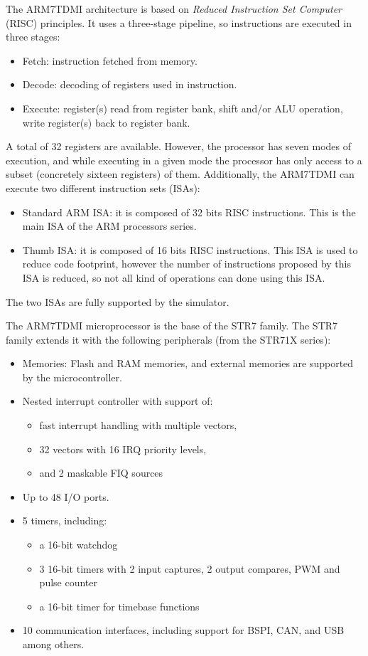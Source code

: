 The ARM7TDMI architecture is based on \textit{Reduced Instruction Set Computer} (RISC) principles.
It uses a three-stage pipeline, so instructions are executed in three stages:
\begin{itemize}
	\item Fetch: instruction fetched from memory.
	\item Decode: decoding of registers used in instruction.
	\item Execute: register(s) read from register bank, shift and/or ALU operation, write register(s) back to register bank.
\end{itemize}
A total of 32 registers are available.
However, the processor has seven modes of execution, and while executing in a given mode the processor has only access to a subset (concretely sixteen registers) of them.
Additionally, the ARM7TDMI can execute two different instruction sets (ISAs):
\begin{itemize}
	\item Standard ARM ISA: it is composed of 32 bits RISC instructions. This is the main ISA of the ARM processors series.
	\item Thumb ISA: it is composed of 16 bits RISC instructions. This ISA is used to reduce code footprint, however the number of instructions proposed by this ISA is reduced, so not all kind of operations can done using this ISA.
\end{itemize}
The two ISAs are fully supported by the simulator.

The ARM7TDMI microprocessor is the base of the STR7 family.
The STR7 family extends it with the following peripherals (from the STR71X series):
\begin{itemize}
	\item Memories: Flash and RAM memories, and external memories are supported by the microcontroller.
	\item Nested interrupt controller with support of:
	\begin{itemize}
		\item fast interrupt handling with multiple vectors, 
		\item 32 vectors with 16 IRQ priority levels,
		\item and 2 maskable FIQ sources
	\end{itemize}
	\item Up to 48 I/O ports.
	\item 5 timers, including:
	\begin{itemize}
		\item a 16-bit watchdog
		\item 3 16-bit timers with 2 input captures, 2 output compares, PWM and pulse counter
		\item a 16-bit timer for timebase functions
	\end{itemize}
	\item 10 communication interfaces, including support for BSPI, CAN, and USB among others.
\end{itemize}


